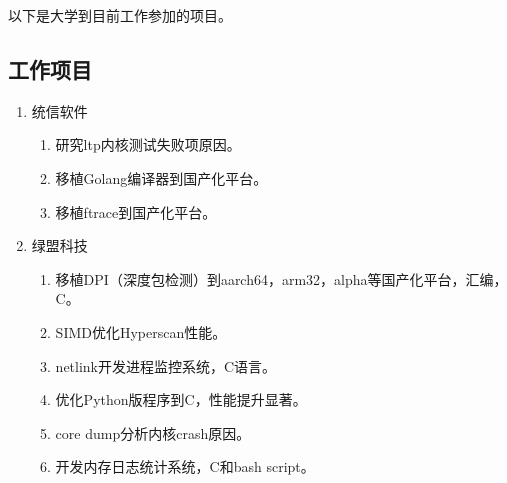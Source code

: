 以下是大学到目前工作参加的项目。

\subsection{工作项目}

\begin{enumerate}
\item 统信软件
  \begin{enumerate}
  \item 研究ltp内核测试失败项原因。
  \item 移植Golang编译器到国产化平台。
  \item 移植ftrace到国产化平台。
  \end{enumerate}
\item 绿盟科技
  \begin{enumerate}
  \item 移植DPI（深度包检测）到aarch64，arm32，alpha等国产化平台，汇编，C。
  \item SIMD优化Hyperscan性能。
  \item netlink开发进程监控系统，C语言。
  \item 优化Python版程序到C，性能提升显著。
  \item core dump分析内核crash原因。
  \item 开发内存日志统计系统，C和bash script。
  \end{enumerate}
  \setcounter{publicationCounter}{\value{enumi}} %
\end{enumerate}


